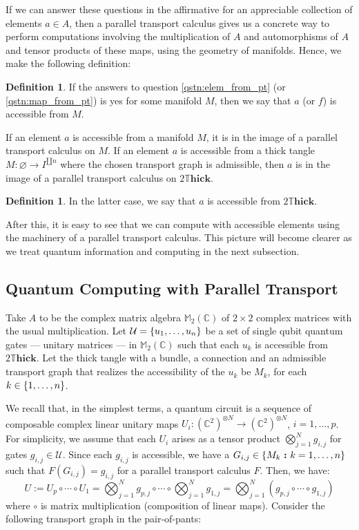 \documentclass{amsart}
\newcommand{\M}{\mathbb{M}}
\newcommand{\C}{\mathbb{C}}
\newcommand{\tensor}{\otimes}
\renewcommand{\to}[1][]{\stackrel{#1}{\longrightarrow}}
\newcommand{\curly}[1]{\left\{ #1 \right\}}
\newcommand{\set}[2][]{\ifthenelse{\equal{#1}{}}
                                  {\curly{#2}}
                                  {\curly{#1\ \textbf{:}\ #2}}}
\newcommand{\DThick}{2\mathbb{T}\mathbf{hick}}
\numberwithin{thm}{section}
\theoremstyle{definition}
\newtheorem{defn}[thm]{Definition}
\begin{document}
If we can answer these questions in the affirmative for an appreciable
collection of elements $a \in A$, then a parallel transport calculus gives us a
concrete way to perform computations involving the multiplication of $A$ and
automorphisms of $A$ and tensor products of these maps, using the geometry of
manifolds. Hence, we make the following definition:

\begin{defn}
If the answers to question \ref{qstn:elem_from_pt} (or \ref{qstn:map_from_pt})
is yes for some manifold $M$, then we say that $a$ (or $f$) is accessible from
$M$.
\end{defn}

If an element $a$ is accessible from a manifold $M$, it is in the image of a
parallel transport calculus on $M$.
If an element $a$ is accessible from a thick tangle
$M : \varnothing \to I^{\amalg n}$ where the chosen transport graph is
admissible, then $a$ is in the image of a parallel transport calculus on $\DThick$.

\begin{defn}
In the latter case, we say that $a$ is accessible from $\DThick$.
\end{defn}

After this, it is easy to see
that we can compute with accessible elements using the machinery of a parallel
transport calculus. This picture will become clearer as we treat quantum information
and computing in the next subsection.

%

\subsection{Quantum Computing with Parallel Transport}

Take $A$ to be the complex matrix algebra $\M_2(\C)$ of $2 \times 2$ complex
matrices with the usual multiplication. Let
$\mathcal{U} = \set{u_1, \dots, u_n}$ be a set
of single qubit quantum gates --- unitary matrices --- in $\M_2(\C)$ such that
each $u_k$ is accessible from $\DThick$. Let the thick tangle with a bundle,
a connection and an admissible transport graph that realizes the accessibility
of the $u_k$ be $M_k$, for each $k \in \set{1, \dots, n}$.

We recall that, in the simplest terms, a quantum circuit is a sequence of
composable complex linear unitary maps
$U_i : (\C^2)^{\tensor N} \to (\C^2)^{\tensor N}$, $i = 1, \dots, p$.
For simplicity, we assume that
each $U_i$ arises as a tensor product $\bigotimes_{j = 1}^{N} g_{i, j}$ for
gates $g_{i, j} \in \mathcal{U}$. Since each $g_{i, j}$ is accessible, we have
a $G_{i, j} \in \set[M_k]{k = 1, \dots, n}$ such that $F(G_{i, j}) = g_{i, j}$
for a parallel transport calculus $F$. Then, we have:
\[
 U := U_p \circ \cdots \circ U_1
  = \bigotimes_{j = 1}^{N} g_{p, j} \circ \cdots
    \circ \bigotimes_{j = 1}^{N} g_{1, j}
  = \bigotimes_{j = 1}^{N} (g_{p, j} \circ \cdots \circ g_{1, j})
\]
where $\circ$ is matrix multiplication (composition of linear maps). Consider
the following transport graph in the pair-of-pants:
\end{document}
